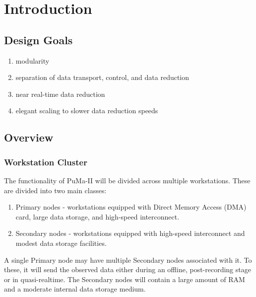 
\chapter{Introduction}

\section{Design Goals}

\begin{enumerate}
\item modularity
\vspace{-2mm}
\item separation of data transport, control, and data reduction
\vspace{-2mm}
\item near real-time data reduction
\vspace{-2mm}
\item elegant scaling to slower data reduction speeds
\end{enumerate}

\section{Overview}

\subsection{Workstation Cluster}

The functionality of PuMa-II will be divided across multiple workstations.
These are divided into two main classes:

\begin{enumerate}

\item Primary nodes - workstations equipped with Direct Memory Access 
	(DMA) card, large data storage, and high-speed interconnect.

\item Secondary nodes - workstations equipped with high-speed interconnect
	and modest data storage facilities.

\end{enumerate}

A single Primary node may have multiple Secondary nodes associated
with it.  To these, it will send the observed data either during an
offline, post-recording stage or in quasi-realtime.  The Secondary
nodes will contain a large amount of RAM and a moderate internal data
storage medium.

